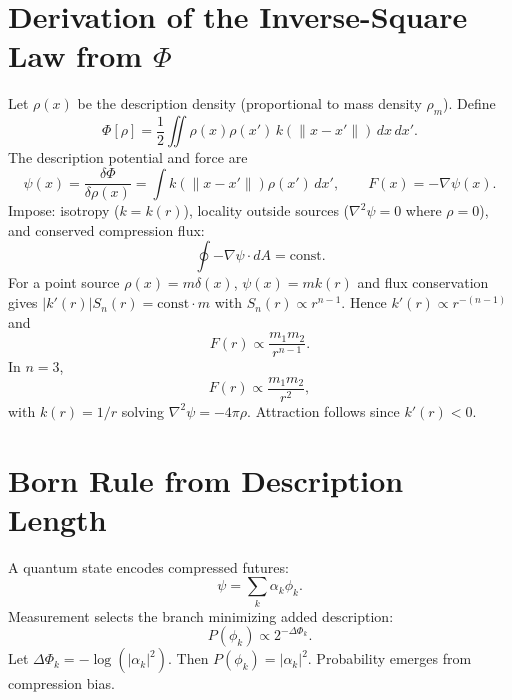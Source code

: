 \documentclass[aps,preprint,onecolumn,longbibliography,nofootinbib]{revtex4-2}
\numberwithin{equation}{section}        %
\begin{document}
\section{Derivation of the Inverse-Square Law from $\Phi$}\label{app:A}
Let $\rho(x)$ be the description density (proportional to mass density $\rho_m$). Define
\begin{equation}
\Phi[\rho] = \frac{1}{2}\iint \rho(x)\rho(x')\,k(\|x-x'\|)\,dx\,dx'. \label{eq:A1}
\end{equation}
The description potential and force are
\begin{equation}
\psi(x) = \frac{\delta \Phi}{\delta \rho(x)} = \int k(\|x-x'\|)\rho(x')\,dx',\qquad F(x) = -\nabla \psi(x). \label{eq:A2}
\end{equation}
Impose: isotropy ($k=k(r)$), locality outside sources ($\nabla^2\psi=0$ where $\rho=0$), and conserved compression flux:
\begin{equation}
\oint -\nabla\psi \cdot dA = \text{const}. \label{eq:Aflux}
\end{equation}
For a point source $\rho(x)=m\delta(x)$, $\psi(x)=mk(r)$ and flux conservation gives $|k'(r)|S_n(r)=\text{const}\cdot m$ with $S_n(r)\propto r^{n-1}$. Hence $k'(r)\propto r^{-(n-1)}$ and
\begin{equation}
F(r) \propto \frac{m_1 m_2}{r^{n-1}}. \label{eq:An}
\end{equation}
In $n=3$,
\begin{equation}
F(r) \propto \frac{m_1 m_2}{r^2}, \label{eq:A3}
\end{equation}
with $k(r)=1/r$ solving $\nabla^2\psi=-4\pi \rho$. Attraction follows since $k'(r)<0$.

\section{Born Rule from Description Length}\label{app:B}
A quantum state encodes compressed futures:
\begin{equation}
\psi = \sum_k \alpha_k \phi_k. \label{eq:B1}
\end{equation}
Measurement selects the branch minimizing added description:
\begin{equation}
P(\phi_k) \propto 2^{-\Delta \Phi_k}. \label{eq:B2}
\end{equation}
Let $\Delta \Phi_k = -\log(|\alpha_k|^2)$. Then $P(\phi_k)=|\alpha_k|^2$. Probability emerges from compression bias.
\end{document}
